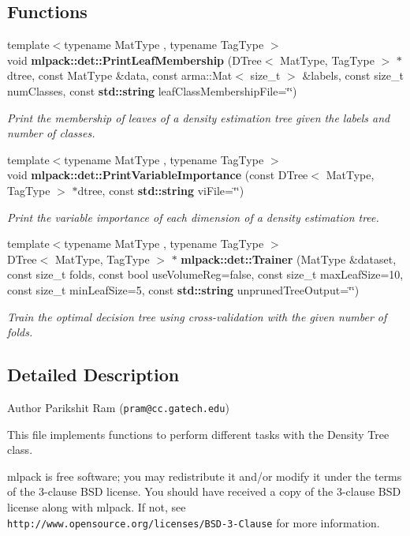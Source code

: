 \subsection*{Functions}
\begin{DoxyCompactItemize}
\item 
{\footnotesize template$<$typename Mat\+Type , typename Tag\+Type $>$ }\\void {\bf mlpack\+::det\+::\+Print\+Leaf\+Membership} (D\+Tree$<$ Mat\+Type, Tag\+Type $>$ $\ast$dtree, const Mat\+Type \&data, const arma\+::\+Mat$<$ size\+\_\+t $>$ \&labels, const size\+\_\+t num\+Classes, const {\bf std\+::string} leaf\+Class\+Membership\+File=\char`\"{}\char`\"{})
\begin{DoxyCompactList}\small\item\em Print the membership of leaves of a density estimation tree given the labels and number of classes. \end{DoxyCompactList}\item 
{\footnotesize template$<$typename Mat\+Type , typename Tag\+Type $>$ }\\void {\bf mlpack\+::det\+::\+Print\+Variable\+Importance} (const D\+Tree$<$ Mat\+Type, Tag\+Type $>$ $\ast$dtree, const {\bf std\+::string} vi\+File=\char`\"{}\char`\"{})
\begin{DoxyCompactList}\small\item\em Print the variable importance of each dimension of a density estimation tree. \end{DoxyCompactList}\item 
{\footnotesize template$<$typename Mat\+Type , typename Tag\+Type $>$ }\\D\+Tree$<$ Mat\+Type, Tag\+Type $>$ $\ast$ {\bf mlpack\+::det\+::\+Trainer} (Mat\+Type \&dataset, const size\+\_\+t folds, const bool use\+Volume\+Reg=false, const size\+\_\+t max\+Leaf\+Size=10, const size\+\_\+t min\+Leaf\+Size=5, const {\bf std\+::string} unpruned\+Tree\+Output=\char`\"{}\char`\"{})
\begin{DoxyCompactList}\small\item\em Train the optimal decision tree using cross-\/validation with the given number of folds. \end{DoxyCompactList}\end{DoxyCompactItemize}


\subsection{Detailed Description}
\begin{DoxyAuthor}{Author}
Parikshit Ram ({\tt pram@cc.\+gatech.\+edu})
\end{DoxyAuthor}
This file implements functions to perform different tasks with the Density Tree class.

mlpack is free software; you may redistribute it and/or modify it under the terms of the 3-\/clause B\+SD license. You should have received a copy of the 3-\/clause B\+SD license along with mlpack. If not, see {\tt http\+://www.\+opensource.\+org/licenses/\+B\+S\+D-\/3-\/\+Clause} for more information. 